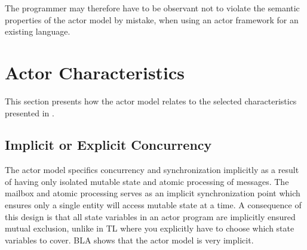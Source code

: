 The programmer may therefore have to be observant not to violate the semantic properties of the actor model by mistake, when using an actor framework for an existing language.




\section{Actor Characteristics}\label{sec:actor_charac}
This section presents how the actor model relates to the selected characteristics presented in .

\subsection{Implicit or Explicit Concurrency}
The actor model specifics concurrency and synchronization implicitly as a result of having only isolated mutable state and atomic processing of messages. The mailbox and atomic processing serves as an implicit synchronization point which ensures only a single entity will access mutable state at a time. A consequence of this design is that  all state variables in an actor program are implicitly ensured mutual exclusion, unlike in \ac{TL} where you explicitly have to choose which state variables to cover. BLA shows that the actor model is very implicit.

